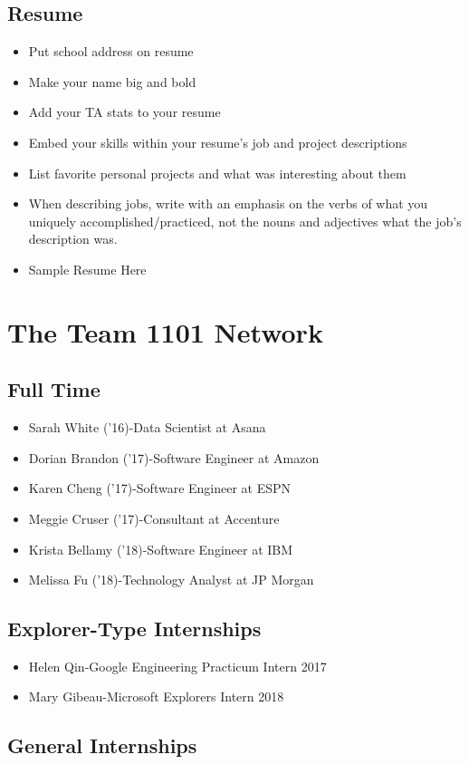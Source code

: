 \documentclass[a4paper]{article}
\begin{document}
\subsection{Resume}
\begin{itemize}
\item Put school address on resume
\item Make your name big and bold
\item Add your TA stats to your resume
\item Embed your skills within your resume’s job and project descriptions
\item List favorite personal projects and what was interesting about them
\item When describing jobs, write with an emphasis on the verbs of what you uniquely accomplished/practiced, not the nouns and adjectives what the job’s description was.
\item Sample Resume Here
\end{itemize}
\section{The Team 1101 Network}

\subsection{Full Time}
\begin{itemize}
\item Sarah White ('16)-Data Scientist at Asana
\item Dorian Brandon ('17)-Software Engineer at Amazon
\item Karen Cheng ('17)-Software Engineer at ESPN
\item Meggie Cruser ('17)-Consultant at Accenture
\item Krista Bellamy ('18)-Software Engineer at IBM
\item Melissa Fu ('18)-Technology Analyst at JP Morgan
\end{itemize}
\subsection{Explorer-Type Internships}
\begin{itemize}
\item Helen Qin-Google Engineering Practicum Intern 2017
\item Mary Gibeau-Microsoft Explorers Intern 2018
\end{itemize}
\subsection{General Internships}
\end{document}
